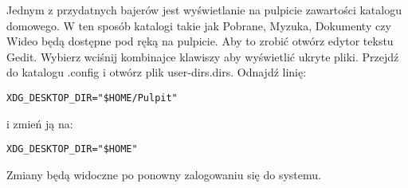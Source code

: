 Jednym z przydatnych bajerów jest wyświetlanie na pulpicie zawartości katalogu domowego. W ten sposób katalogi takie jak Pobrane, Myzuka, Dokumenty czy Wideo będą dostępne pod ręką na pulpicie. Aby to zrobić otwórz edytor tekstu Gedit. Wybierz  wciśnij kombinajce klawiszy  aby wyświetlić ukryte pliki. Przejdź do katalogu .config i otwórz plik \textcolor{ubuntu_orange}{user-dirs.dirs}. Odnajdź linię:
\begin{lstlisting}
XDG_DESKTOP_DIR="$HOME/Pulpit"
\end{lstlisting}
i zmień ją na:
\begin{lstlisting}
XDG_DESKTOP_DIR="$HOME"
\end{lstlisting}

Zmiany będą widoczne po ponowny zalogowaniu się do systemu.